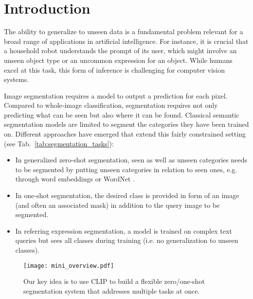 \documentclass[10pt,twocolumn,letterpaper]{article}
\begin{document}
\section{Introduction}

\let\thefootnote\relax{}

The ability to generalize to unseen data is a fundamental problem relevant for a broad range of applications in artificial intelligence. For instance, it is crucial that a household robot understands the prompt of its user, which might involve an unseen object type or an uncommon expression for an object. While humans excel at this task, this form of inference is challenging for computer vision systems. 

Image segmentation requires a model to output a prediction for each pixel. Compared to whole-image classification, segmentation requires not only predicting what can be seen but also where it can be found. 
Classical semantic segmentation models are limited to segment the categories they have been trained on. 
Different approaches have emerged that extend this fairly constrained setting (see Tab.~\ref{tab:segmentation_tasks}):
\begin{itemize}
\setlength\itemsep{0em}
    \item In generalized zero-shot segmentation, seen as well as unseen categories needs to be segmented by putting unseen categories in relation to seen ones, e.g. through word embeddings \cite{word2vec} or WordNet \cite{wordnet}. 
    \item In one-shot segmentation, the desired class is provided in form of an image (and often an associated mask) in addition to the query image to be segmented.
    \item In referring expression segmentation, a model is trained on complex text queries but sees all classes during training (i.e. no generalization to unseen classes).
\end{itemize}

\begin{figure}
    \centering
    \texttt{[image: mini\_overview.pdf]}
    \caption{Our key idea is to use CLIP to build a flexible zero/one-shot segmentation system that addresses multiple tasks at once.}
    \label{fig:mini_overview}
\end{figure}
\end{document}
